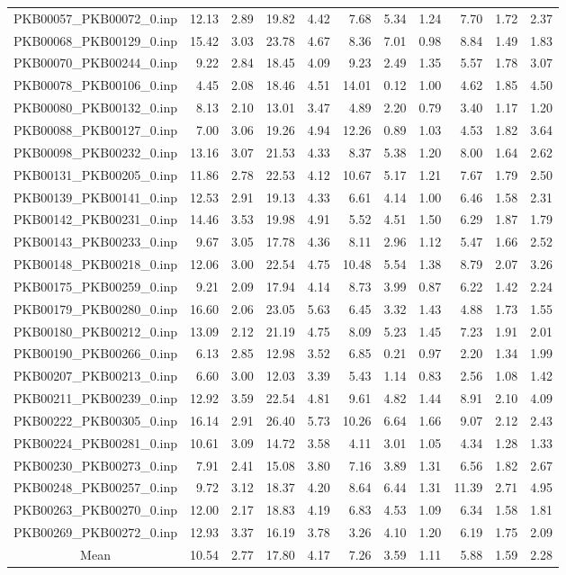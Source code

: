 {\begin{longtable}{@{}cr@{\hspace{1em}}r@{\hspace{1em}}r@{\hspace{1em}}r@{\hspace{1em}}r@{\hspace{2em}}r@{\hspace{1em}}r@{\hspace{1em}}r@{\hspace{1em}}r@{\hspace{1em}}r@{}}
PKB00057\_PKB00072\_0.inp&12.13&2.89&19.82&4.42&7.68&5.34&1.24&7.70&1.72&2.37\\
PKB00068\_PKB00129\_0.inp&15.42&3.03&23.78&4.67&8.36&7.01&0.98&8.84&1.49&1.83\\
PKB00070\_PKB00244\_0.inp&9.22&2.84&18.45&4.09&9.23&2.49&1.35&5.57&1.78&3.07\\
PKB00078\_PKB00106\_0.inp&4.45&2.08&18.46&4.51&14.01&0.12&1.00&4.62&1.85&4.50\\
PKB00080\_PKB00132\_0.inp&8.13&2.10&13.01&3.47&4.89&2.20&0.79&3.40&1.17&1.20\\
PKB00088\_PKB00127\_0.inp&7.00&3.06&19.26&4.94&12.26&0.89&1.03&4.53&1.82&3.64\\
PKB00098\_PKB00232\_0.inp&13.16&3.07&21.53&4.33&8.37&5.38&1.20&8.00&1.64&2.62\\
PKB00131\_PKB00205\_0.inp&11.86&2.78&22.53&4.12&10.67&5.17&1.21&7.67&1.79&2.50\\
PKB00139\_PKB00141\_0.inp&12.53&2.91&19.13&4.33&6.61&4.14&1.00&6.46&1.58&2.31\\
PKB00142\_PKB00231\_0.inp&14.46&3.53&19.98&4.91&5.52&4.51&1.50&6.29&1.87&1.79\\
PKB00143\_PKB00233\_0.inp&9.67&3.05&17.78&4.36&8.11&2.96&1.12&5.47&1.66&2.52\\
PKB00148\_PKB00218\_0.inp&12.06&3.00&22.54&4.75&10.48&5.54&1.38&8.79&2.07&3.26\\
PKB00175\_PKB00259\_0.inp&9.21&2.09&17.94&4.14&8.73&3.99&0.87&6.22&1.42&2.24\\
PKB00179\_PKB00280\_0.inp&16.60&2.06&23.05&5.63&6.45&3.32&1.43&4.88&1.73&1.55\\
PKB00180\_PKB00212\_0.inp&13.09&2.12&21.19&4.75&8.09&5.23&1.45&7.23&1.91&2.01\\
PKB00190\_PKB00266\_0.inp&6.13&2.85&12.98&3.52&6.85&0.21&0.97&2.20&1.34&1.99\\
PKB00207\_PKB00213\_0.inp&6.60&3.00&12.03&3.39&5.43&1.14&0.83&2.56&1.08&1.42\\
PKB00211\_PKB00239\_0.inp&12.92&3.59&22.54&4.81&9.61&4.82&1.44&8.91&2.10&4.09\\
PKB00222\_PKB00305\_0.inp&16.14&2.91&26.40&5.73&10.26&6.64&1.66&9.07&2.12&2.43\\
PKB00224\_PKB00281\_0.inp&10.61&3.09&14.72&3.58&4.11&3.01&1.05&4.34&1.28&1.33\\
PKB00230\_PKB00273\_0.inp&7.91&2.41&15.08&3.80&7.16&3.89&1.31&6.56&1.82&2.67\\
PKB00248\_PKB00257\_0.inp&9.72&3.12&18.37&4.20&8.64&6.44&1.31&11.39&2.71&4.95\\
PKB00263\_PKB00270\_0.inp&12.00&2.17&18.83&4.19&6.83&4.53&1.09&6.34&1.58&1.81\\
PKB00269\_PKB00272\_0.inp&12.93&3.37&16.19&3.78&3.26&4.10&1.20&6.19&1.75&2.09\\
\midrule
Mean&10.54&2.77&17.80&4.17&7.26&3.59&1.11&5.88&1.59&2.28\\
\bottomrule
\end{longtable}}
